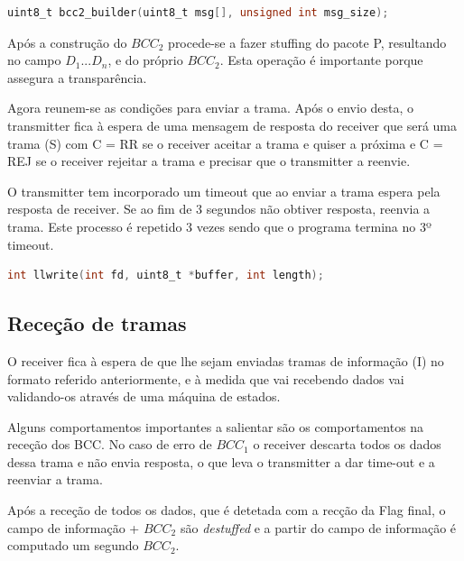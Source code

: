 \documentclass[a4paper,11pt,portuguese]{article}
\begin{document}
\begin{lstlisting}[language=C]
uint8_t bcc2_builder(uint8_t msg[], unsigned int msg_size);    
\end{lstlisting}

    Após a construção do $BCC_2$ procede-se a fazer stuffing do pacote P, resultando no
    campo $D_1...D_n$, e do próprio $BCC_2$. Esta operação é importante porque assegura a transparência.

    Agora reunem-se as condições para enviar a trama. Após o envio desta, o transmitter fica à espera
    de uma mensagem de resposta do receiver que será uma trama (S) com C = RR se o receiver aceitar a
    trama e quiser a próxima e C = REJ se o receiver rejeitar a trama e precisar que o transmitter a
    reenvie.

    O transmitter tem incorporado um timeout que ao enviar a trama espera pela resposta de receiver. Se
    ao fim de 3 segundos não obtiver resposta, reenvia a trama. Este processo é repetido 3 vezes sendo que
    o programa termina no 3º timeout.

\begin{lstlisting}[language=C]
int llwrite(int fd, uint8_t *buffer, int length);   
\end{lstlisting}

    \subsection{Receção de tramas}

    O receiver fica à espera de que lhe sejam enviadas tramas de informação (I) no formato referido
    anteriormente, e à medida que vai recebendo dados vai validando-os através de uma máquina de estados.

    Alguns comportamentos importantes a salientar são os comportamentos na receção dos BCC.
    No caso de erro de $BCC_1$ o receiver descarta todos os dados dessa trama e não envia resposta, o que
    leva o transmitter a dar time-out e a reenviar a trama.

    Após a receção de todos os dados, que é detetada com a recção da Flag final, o campo de informação 
    + $BCC_2$ são \textit{destuffed} e a partir do campo de informação é computado um segundo $BCC_2$.
\end{document}

